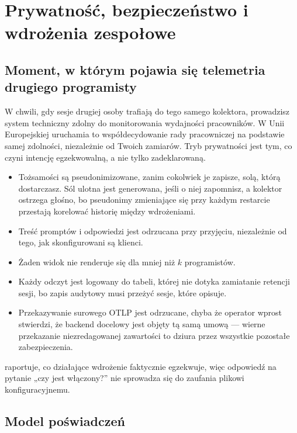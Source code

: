 \documentclass[11pt,a4paper]{article}
\newcommand{\code}[1]{\texttt{\detokenize{#1}}}
\begin{document}
\section{Prywatność, bezpieczeństwo i wdrożenia zespołowe}

\subsection{Moment, w którym pojawia się telemetria drugiego programisty}

W chwili, gdy sesje drugiej osoby trafiają do tego samego kolektora, prowadzisz
system techniczny zdolny do monitorowania wydajności pracowników. W Unii
Europejskiej uruchamia to współdecydowanie rady pracowniczej na podstawie samej
zdolności, niezależnie od Twoich zamiarów. Tryb prywatności jest tym, co czyni
intencję egzekwowalną, a nie tylko zadeklarowaną.

\begin{itemize}[leftmargin=*]
    \item Tożsamości są pseudonimizowane, zanim cokolwiek je zapisze, solą,
    którą dostarczasz. Sól ulotna jest generowana, jeśli o niej zapomnisz, a
    kolektor ostrzega głośno, bo pseudonimy zmieniające się przy każdym
    restarcie przestają korelować historię między wdrożeniami.
    \item Treść promptów i odpowiedzi jest odrzucana przy przyjęciu, niezależnie
    od tego, jak skonfigurowani są klienci.
    \item Żaden widok nie renderuje się dla mniej niż $k$ programistów.
    \item Każdy odczyt jest logowany do tabeli, której nie dotyka zamiatanie
    retencji sesji, bo zapis audytowy musi przeżyć sesje, które opisuje.
    \item Przekazywanie surowego OTLP jest odrzucane, chyba że operator wprost
    stwierdzi, że backend docelowy jest objęty tą samą umową --- wierne
    przekazanie niezredagowanej zawartości to dziura przez wszystkie pozostałe
    zabezpieczenia.
\end{itemize}

\code{GET /api/privacy} raportuje, co działające wdrożenie faktycznie
egzekwuje, więc odpowiedź na pytanie „czy jest włączony?'' nie sprowadza się do
zaufania plikowi konfiguracyjnemu.

\subsection{Model poświadczeń}
\end{document}
